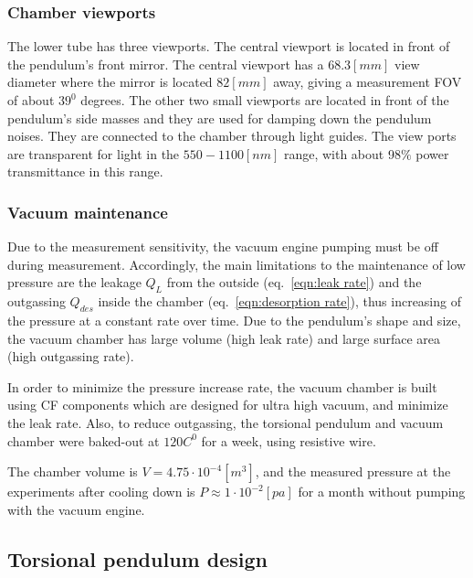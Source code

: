 \documentclass[\main/master.tex]{subfiles}
\begin{document}
\subsubsection{Chamber viewports}
\par\noindent
The lower tube has three viewports. The central viewport is located in front of the pendulum's front mirror. The central viewport has a $68.3 [mm]$ view diameter where the mirror is located $82 [mm]$ away, giving a measurement FOV of about $39^0$ degrees. The other two small viewports are located in front of the pendulum's side masses and they are used for damping down the pendulum noises. They are connected to the chamber through light guides. The view ports are transparent for light in the $550-1100 [nm]$ range, with about 98$\%$ power transmittance in this range. 


\subsubsection{Vacuum maintenance}
\par\noindent
Due to the measurement sensitivity, the vacuum engine pumping must be off during measurement. Accordingly, the main limitations to the maintenance of low pressure are the leakage $Q_L$ from the outside (eq.~\ref{eqn:leak rate}) and the outgassing $Q_{des}$ inside the chamber (eq.~\ref{eqn:desorption rate}), thus increasing of the pressure at a constant rate over time. Due to the pendulum's shape and size, the vacuum chamber has large volume (high leak rate) and large surface area (high outgassing rate). 
\par\noindent
In order to minimize the pressure increase rate, the vacuum chamber is built using CF components which are designed for ultra high vacuum, and minimize the leak rate. Also, to reduce outgassing, the torsional pendulum and vacuum chamber were baked-out at $120 C^0$ for a week, using resistive wire. 
\par\noindent
The chamber volume is $V = 4.75\cdot 10^{-4}[m^3]$, and the measured pressure at the experiments after cooling down is $P \approx 1\cdot 10^{−2} [pa]$ for a month without pumping with the vacuum engine.
\subsection{Torsional pendulum design}
\end{document}
